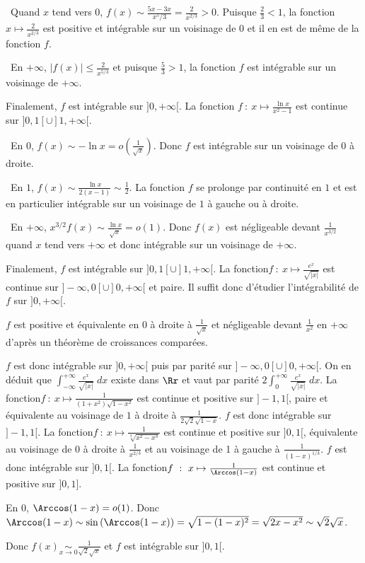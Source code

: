 {{\textbullet~Quand $x$ tend vers $0$,  $f(x)\sim\frac{5x-3x}{x^5/3}=\frac{2}{x^{2/3}}>0$. Puisque $\frac{2}{3}<1$, la fonction $x\mapsto\frac{2}{x^{2/3}}$ est positive et intégrable sur un voisinage de $0$ et il en est de même de la fonction $f$.

\textbullet~En $+\infty$, $|f(x)|\leqslant\frac{2}{x^{5/3}}$ et puisque $\frac{5}{3}>1$, la fonction $f$ est intégrable sur  un voisinage de $+\infty$.

Finalement, $f$ est intégrable sur $]0,+\infty[$.
La fonction $f~:~x\mapsto\frac{\ln x}{x^2-1}$ est continue sur $]0,1[\cup]1,+\infty[$.

\textbullet~En $0$,  $f(x)\sim-\ln x=o\left(\frac{1}{\sqrt{x}}\right)$. Donc $f$ est intégrable sur un voisinage de $0$ à droite.

\textbullet~En $1$, $f(x)\sim\frac{\ln x}{2(x-1)}\sim\frac{1}{2}$. La fonction $f$ se prolonge par continuité en $1$ et est en particulier intégrable sur un voisinage de $1$ à gauche ou à droite.

\textbullet~En $+\infty$,  $x^{3/2}f(x)\sim\frac{\ln x}{\sqrt{x}}=o(1)$. Donc $f(x)$ est négligeable devant $\frac{1}{x^{3/2}}$ quand $x$ tend vers $+\infty$ et donc intégrable sur un voisinage de $+\infty$.

Finalement, $f$ est intégrable sur $]0,1[\cup]1,+\infty[$.
La fonction$f~:~x\mapsto\frac{e^x}{\sqrt{|x|}}$ est continue sur $]-\infty,0[\cup]0,+\infty[$ et paire. Il suffit donc d'étudier l'intégrabilité de $f$ sur $]0,+\infty[$.

$f$ est positive et équivalente en $0$ à droite à $\frac{1}{\sqrt{x}}$ et négligeable devant $\frac{1}{x^2}$  en $+\infty$ d'après un théorème de croissances comparées.

$f$ est donc intégrable sur $]0,+\infty[$ puis par parité sur $]-\infty,0[\cup]0,+\infty[$. On en déduit que $\int_{-\infty}^{+\infty}\frac{e^x}{\sqrt{|x|}}\;dx$ existe dans $\Rr$ et vaut par parité $2\int_{0}^{+\infty}\frac{e^x}{\sqrt{|x|}}\;dx$.
La fonction$f~:~x\mapsto\frac{1}{(1+x^2)\sqrt{1-x^2}}$ est continue et positive sur $]-1,1[$, paire et équivalente au voisinage de $1$ à droite à $\frac{1}{2\sqrt{2}\sqrt{1-x}}$. $f$ est donc intégrable sur $]-1,1[$.
La fonction$f~:~x\mapsto\frac{1}{\sqrt[3]{x^2-x^3}}$ est continue et positive sur $]0,1[$, équivalente au voisinage de $0$ à droite à $\frac{1}{x^{2/3}}$ et au voisinage de 1 à gauche à $\frac{1}{(1-x)^{1/3}}$. $f$ est donc intégrable sur $]0,1[$.
La fonction$f~:~x\mapsto\frac{1}{\Arccos(1-x)}$ est continue et positive sur $]0,1]$.

En $0$, $\Arccos(1-x) = o(1)$. Donc $\Arccos(1-x)\sim\sin\left(\Arccos(1-x)\right)=\sqrt{1-(1-x)^2}=\sqrt{2x-x^2}\sim\sqrt{2}\sqrt{x}$.

Donc $f(x)\underset{x\rightarrow0}{\sim}\frac{1}{\sqrt{2}\sqrt{x}}$ et $f$ est intégrable sur $]0,1[$.
}
}
